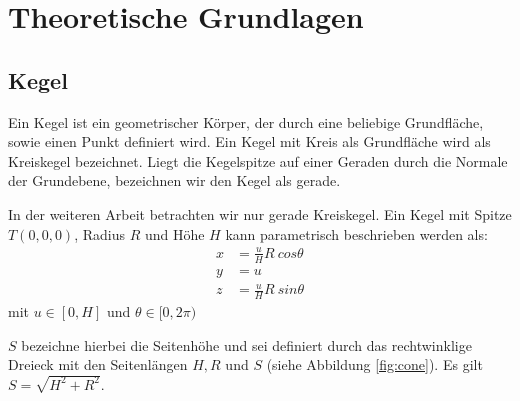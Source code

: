 \chapter{Theoretische Grundlagen}
\label{ch:theory}

%


\section{Kegel}
\label{s:cone}

\begin{definition}[Kegel]
	Ein Kegel ist ein geometrischer Körper, der durch eine beliebige Grundfläche, sowie einen Punkt definiert wird.
	Ein Kegel mit Kreis als Grundfläche wird als Kreiskegel bezeichnet. Liegt die Kegelspitze auf einer Geraden durch die Normale der Grundebene, bezeichnen wir den Kegel als gerade.
\end{definition}

In der weiteren Arbeit betrachten wir nur gerade Kreiskegel. Ein Kegel mit Spitze $T(0,0,0)$, Radius $R$ und Höhe $H$ kann parametrisch beschrieben werden als:
\begin{equation} \label{eq:paramCone}
\begin{aligned}
x &= \frac{u}{H} R~cos \theta \\
y &= u \\
z &= \frac{u}{H} R~sin \theta
\end{aligned}
\end{equation} %
mit $u\in [0, H]$ und $\theta \in [0, 2\pi)$ 

$S$ bezeichne hierbei die Seitenhöhe und sei definiert durch das rechtwinklige Dreieck mit den Seitenlängen $H,R$ und $S$ (siehe Abbildung \ref{fig:cone}). Es gilt $S = \sqrt{H^2 + R^2}$.

